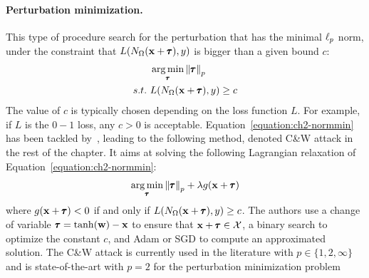 \paragraph{Perturbation minimization.}
This type of procedure search for the perturbation that has the minimal $\ell_p $ norm, under the constraint that $L(N_\Omega(\mathbf{x} + \pmb{\tau}), y)$ is bigger than a given bound $c$:
\begin{align}
  &\operatorname*{arg\,min}_{\pmb{\tau}} \norm{\pmb{\tau}}_p \label{equation:ch2-normmin} \\
  s.t.\ &L(N_\Omega(\mathbf{x} + \pmb{\tau}), y) \geq c \notag
\end{align}
The value of $c$ is typically chosen depending on the loss function $L$. For example, if $L$ is the $0-1$ loss, any $c > 0$ is acceptable.
Equation~\ref{equation:ch2-normmin} has been tackled by~\citet{carlini2017towards}, leading to the following method, denoted C\&W attack in the rest of the chapter. It aims at solving the following Lagrangian relaxation of Equation~\ref{equation:ch2-normmin}:
\begin{equation}
  \operatorname*{arg\,min}_{\pmb{\tau}} \norm{\pmb{\tau}}_p + \lambda g(\mathbf{x}+\pmb{\tau})
\end{equation}
where $g(\mathbf{x} + \pmb{\tau})<0$ if and only if $L(N_\Omega(\mathbf{x} + \pmb{\tau}),y) \geq c$. 
The authors use a change of variable $\pmb{\tau} = \tanh(\mathbf{w}) - \mathbf{x}$ to ensure that $\mathbf{x} + \pmb{\tau} \in \mathcal{X}$, a binary search to optimize the constant $c$, and Adam or SGD to compute an approximated solution.
The C\&W attack is currently used in the literature with $p \in \{1, 2, \infty \}$ and is state-of-the-art with $p=2$ for the perturbation minimization problem






